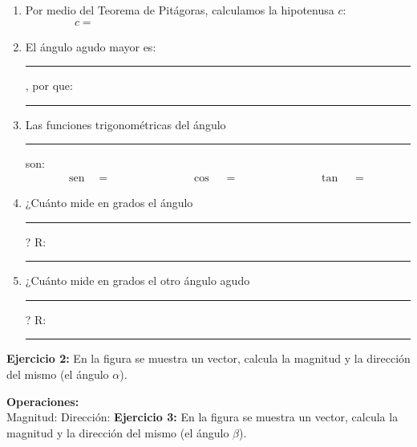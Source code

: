 \documentclass[12pt]{article}
\begin{document}
\begin{enumerate}
\item  Por medio del Teorema de Pitágoras, calculamos la hipotenusa $c$:
\begin{align*}
c = \hspace{10cm}
\end{align*}
\item El ángulo agudo mayor es: \rule{1.5cm}{0.7pt}, por que: \rule{5cm}{0.7pt}
\item 
Las funciones trigonométricas del ángulo \rule{1.5cm}{0.7pt} son:
\begin{align*}
\text{sen} \quad = \hspace{3cm} \cos \quad = \hspace{3cm} \tan \quad = 
\end{align*}
\item ¿Cuánto mide en grados el ángulo \rule{1.5cm}{0.7pt}? R: \rule{1.5cm}{0.7pt}
\item 
¿Cuánto mide en grados el otro ángulo agudo \rule{1.5cm}{0.7pt}? R: \rule{1.5cm}{0.7pt}
\end{enumerate}
\textbf{Ejercicio 2: } En la figura se muestra un vector, calcula la magnitud y la dirección del mismo (el ángulo $\alpha$).
\begin{figure}[H]
\centering
{}
\end{figure}
\textbf{Operaciones:}
\\[1em]
Magnitud: \hspace{7cm} Dirección: 
\newpage
\textbf{Ejercicio 3: } En la figura se muestra un vector, calcula la magnitud y la dirección del mismo (el ángulo $\beta$).
\begin{figure}[H]
\centering
{}
\end{figure}
\end{document}
